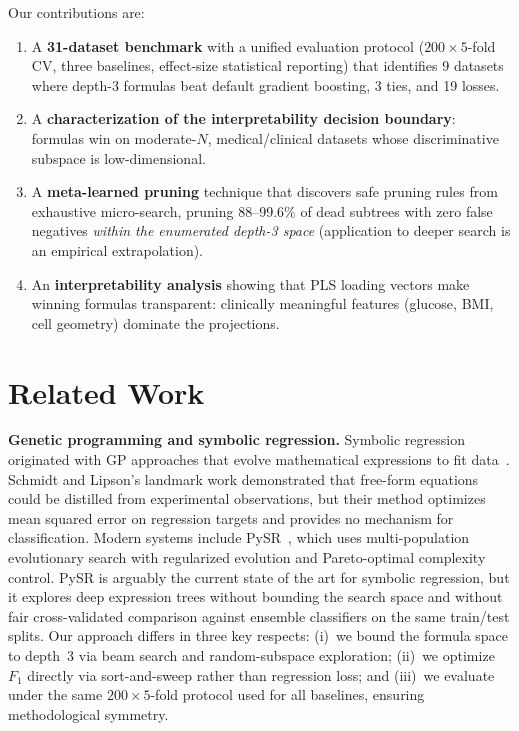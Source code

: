 \documentclass[journal]{IEEEtran}
\begin{document}
Our contributions are:
\begin{enumerate}
\item A \textbf{31-dataset benchmark} with a unified evaluation
protocol ($200 \times 5$-fold CV, three baselines, effect-size
statistical reporting) that identifies 9 datasets where
depth-3 formulas beat default gradient boosting, 3 ties, and 19 losses.
\item A \textbf{characterization of the interpretability decision
boundary}: formulas win on moderate-$N$, medical/clinical
datasets whose discriminative subspace is low-dimensional.
\item A \textbf{meta-learned pruning} technique that discovers
safe pruning rules from exhaustive micro-search, pruning
88--99.6\% of dead subtrees with zero false negatives
\emph{within the enumerated depth-3 space} (application to
deeper search is an empirical extrapolation).
\item An \textbf{interpretability analysis} showing that PLS
loading vectors make winning formulas transparent:
clinically meaningful features (glucose, BMI, cell geometry)
dominate the projections.
\end{enumerate}

\section{Related Work}
\label{sec:related}

\textbf{Genetic programming and symbolic regression.}
Symbolic regression originated with GP approaches that evolve
mathematical expressions to fit data~\cite{schmidt2009distilling}.
Schmidt and Lipson's landmark work demonstrated that free-form
equations could be distilled from experimental observations, but their
method optimizes mean squared error on regression targets and provides
no mechanism for classification.  Modern systems include
PySR~\cite{cranmer2023interpretable}, which uses multi-population
evolutionary search with regularized evolution and Pareto-optimal
complexity control.  PySR is arguably the current state of the art for
symbolic regression, but it explores deep expression trees without
bounding the search space and without fair cross-validated comparison
against ensemble classifiers on the same train/test splits.  Our
approach differs in three key respects: (i)~we bound the formula space
to depth~3 via beam search and random-subspace exploration; (ii)~we optimize $F_1$
directly via sort-and-sweep rather than regression loss; and (iii)~we
evaluate under the same $200 \times 5$-fold protocol used for all
baselines, ensuring methodological symmetry.
\end{document}
